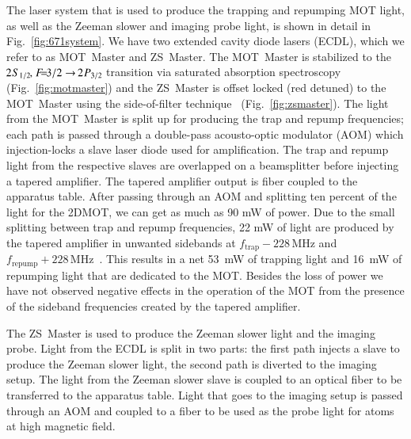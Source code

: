 \documentclass[oneside,12pt]{memoir}
\newcommand{\twos}[1]{\ensuremath{\hspace{-1pt}2\hspace{0.5pt}\hspace{0pt}S_{#1}\hspace{-1pt}}}
\newcommand{\twop}[1]{\ensuremath{\hspace{-1pt}2\hspace{0.5pt}\hspace{0pt}P_{#1}\hspace{-1pt}}}
\newcommand{\cm}{\ensuremath{,\hspace{1pt}}}
\newcommand{\f}[1]{\ensuremath{F\hspace{-5pt}=\hspace{-4pt}#1}}
\begin{document}
The laser system that is used to produce the trapping and repumping MOT light,
as well as the Zeeman slower and imaging probe light, is shown in detail in
Fig.~\ref{fig:671system}. We have two extended cavity diode lasers (ECDL),
which we refer to as MOT~Master and ZS~Master. The MOT~Master is stabilized to
the $\twos{1/2}\cm\f{3/2}\rightarrow\twop{3/2}$ transition via saturated
absorption spectroscopy (Fig.~\ref{fig:motmaster}) and the ZS~Master is
offset locked (red detuned) to the MOT~Master using the side-of-filter
technique~\cite{SoftLock2004} (Fig.~\ref{fig:zsmaster}).   The light from
the MOT~Master is split up for producing the trap and repump frequencies; each
path is passed through a double-pass acousto-optic modulator (AOM) which
injection-locks a slave laser diode used for amplification.  The trap and
repump light from the respective slaves are overlapped on a beamsplitter before
injecting a tapered amplifier.  The tapered amplifier output is fiber coupled
to the apparatus table. After passing through an AOM and splitting ten percent
of the light for the 2DMOT, we can get as much as 90 mW of power.   Due to the
small splitting between trap and repump frequencies, 22 mW of light are
produced by the tapered amplifier in unwanted sidebands at
\mbox{$f_{\mathrm{trap}}-228\,\mathrm{MHz}$} and
\mbox{$f_{\mathrm{repump}}+228\,\mathrm{MHz}$}~\cite{Ferrari1999}. This results
in a net 53~mW of trapping light and 16~mW of repumping light that are
dedicated to the MOT.  Besides the loss of power we have not observed negative
effects in the operation of the MOT from the presence of the sideband
frequencies created by the tapered amplifier.

The ZS~Master is used to produce the Zeeman slower light and the imaging probe.
Light from the ECDL is  split in two parts:  the first path injects a slave to
produce the Zeeman slower light, the second path is diverted to the imaging
setup.   The light from the Zeeman slower slave is coupled to an optical fiber
to be transferred to the apparatus table.   Light that goes to the imaging
setup is passed through an AOM and coupled to a fiber to be used as the probe
light for atoms at high magnetic field.   
\end{document}
